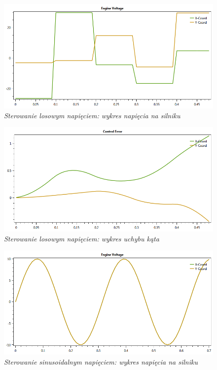 \documentclass[12pt, oneside]{report}
\theoremstyle{definition}
\begin{document}
\begin{figure}[H]
	\centering
		\includegraphics[width = 350pt]{RandomEV} 
		\caption{\textit{Sterowanie losowym napięciem: wykres napięcia na silniku}}
		\label{plot:RandomEV}
\end{figure}

\begin{figure}[H]
	\centering
		\includegraphics[width = 350pt]{RandomCE} 
		\caption{\textit{Sterowanie losowym napięciem: wykres uchybu kąta}}
		\label{plot:RandomCE}
\end{figure}

\begin{figure}[H]
	\centering
		\includegraphics[width = 350pt]{SinusoidalEV} 
		\caption{\textit{Sterowanie sinusoidalnym napięciem: wykres napięcia na silniku}}
		\label{plot:SinusoidalEV}
\end{figure}
\end{document}
